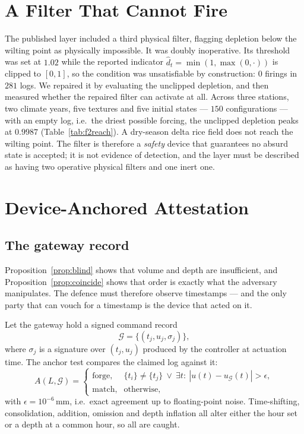 \documentclass[journal]{IEEEtran}
\begin{document}
\section{A Filter That Cannot Fire}
\label{sec:v2reach}

The published layer included a third physical filter, flagging depletion below
the wilting point as physically impossible. It was doubly inoperative. Its
threshold was set at $1.02$ while the reported indicator
$\hat d_t=\min(1,\max(0,\cdot))$ is clipped to $[0,1]$, so the condition was
unsatisfiable by construction: $0$ firings in $281$ logs. We repaired it by
evaluating the unclipped depletion, and then measured whether the repaired filter
can activate at all. Across three stations, two climate years, five textures and
five initial states --- $150$ configurations --- with an empty log, i.e.\ the
driest possible forcing, the unclipped depletion peaks at $0.9987$
(Table~\ref{tab:f2reach}). A dry-season delta rice field does not reach the
wilting point. The filter is therefore a \emph{safety} device that guarantees no
absurd state is accepted; it is not evidence of detection, and the layer must be
described as having two operative physical filters and one inert one.

\section{Device-Anchored Attestation}
\label{sec:anchor}

\subsection{The gateway record}

Proposition~\ref{prop:blind} shows that volume and depth are insufficient, and
Proposition~\ref{prop:coincide} shows that order is exactly what the adversary
manipulates. The defence must therefore observe timestamps --- and the only party
that can vouch for a timestamp is the device that acted on it.

Let the gateway hold a signed command record
\begin{equation}
\mathcal{G}=\{(t_j,u_j,\sigma_j)\},
\label{eq:gateway}
\end{equation}
where $\sigma_j$ is a signature over $(t_j,u_j)$ produced by the controller at
actuation time. The anchor test compares the claimed log against it:
\begin{equation}
A(L,\mathcal{G})=
\begin{cases}
\text{forge}, & \{t_i\}\neq\{t_j\}\ \vee\ \exists t:\ |u(t)-u_{\mathcal{G}}(t)|>\epsilon,\\
\text{match}, & \text{otherwise},
\end{cases}
\label{eq:anchor}
\end{equation}
with $\epsilon=10^{-6}$\,mm, i.e.\ exact agreement up to floating-point noise.
Time-shifting, consolidation, addition, omission and depth inflation all alter
either the hour set or a depth at a common hour, so all are caught.
\end{document}
